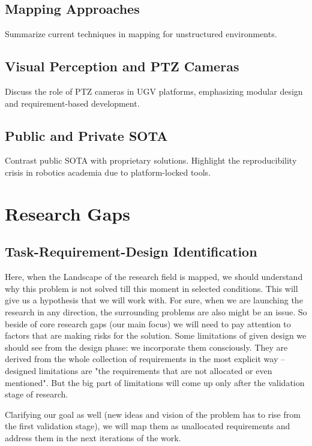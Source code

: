 \documentclass[runningheads]{llncs}
\begin{document}
\subsection{Mapping Approaches}
Summarize current techniques in mapping for unstructured environments.

\subsection{Visual Perception and PTZ Cameras}
Discuss the role of PTZ cameras in UGV platforms, emphasizing modular design and requirement-based development.

\subsection{Public and Private SOTA}
Contrast public SOTA with proprietary solutions. Highlight the reproducibility crisis in robotics academia due to platform-locked tools.

\section{Research Gaps}

\subsection{Task-Requirement-Design Identification}

Here, when the Landscape of the research field is mapped, we should understand why this problem is not solved till this moment in selected conditions.
This will give us a hypothesis that we will work with.
For sure, when we are launching the research in any direction, the surrounding problems are also might be an issue. So beside of core research gaps (our main focus) we will need to pay attention to factors that are making risks for the solution.
Some limitations of given design we should see from the design phase: we incorporate them consciously. They are derived from the whole collection of requirements in the most explicit way -- designed limitations are "the requirements that are not allocated or even mentioned". But the big part of limitations will come up only after the validation stage of research.

Clarifying our goal as well (new ideas and vision of the problem has to rise from the first validation stage), we will map them as unallocated requirements and address them in the next iterations of the work.
\end{document}
